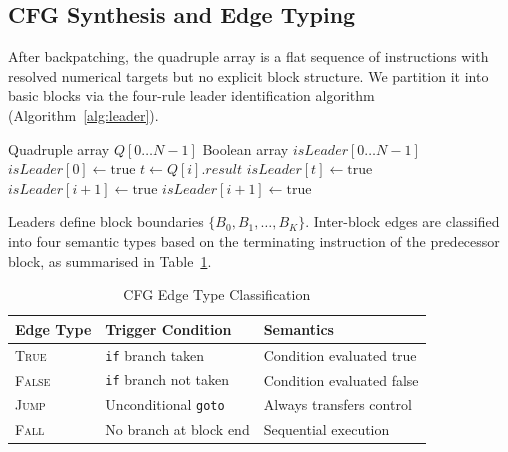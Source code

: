 \documentclass[conference]{IEEEtran}
\begin{document}
\subsection{CFG Synthesis and Edge Typing}
\label{sec:cfg}

After backpatching, the quadruple array is a flat sequence of instructions with resolved numerical targets but no explicit block structure. We partition it into basic blocks via the four-rule leader identification algorithm (Algorithm~\ref{alg:leader}).

\begin{algorithm}[t]
\caption{Leader Identification}
\label{alg:leader}
\footnotesize
\begin{algorithmic}[1]
\REQUIRE Quadruple array $Q[0 \dots N{-}1]$
\ENSURE Boolean array $\mathit{isLeader}[0 \dots N{-}1]$
\STATE $\mathit{isLeader}[0] \leftarrow \mathrm{true}$ 
        \STATE $t \leftarrow Q[i].\mathit{result}$
        \STATE $\mathit{isLeader}[t] \leftarrow \mathrm{true}$ 
            \STATE $\mathit{isLeader}[i{+}1] \leftarrow \mathrm{true}$ 
        \ENDIF
    \ENDIF
            \STATE $\mathit{isLeader}[i{+}1] \leftarrow \mathrm{true}$ 
        \ENDIF
    \ENDIF
\ENDFOR
\end{algorithmic}
\end{algorithm}

Leaders define block boundaries $\{B_0, B_1, \ldots, B_K\}$. Inter-block edges are classified into four semantic types based on the terminating instruction of the predecessor block, as summarised in Table~\ref{tab:edges}.

\begin{table}[t]
\centering
\caption{CFG Edge Type Classification}
\label{tab:edges}
\footnotesize
\begin{tabular}{@{}lll@{}}
\toprule
\textbf{Edge Type} & \textbf{Trigger Condition} & \textbf{Semantics}\\
\midrule
\textsc{True}  & \texttt{if} branch taken     & Condition evaluated true\\
\textsc{False} & \texttt{if} branch not taken & Condition evaluated false\\
\textsc{Jump}  & Unconditional \texttt{goto}  & Always transfers control\\
\textsc{Fall}  & No branch at block end       & Sequential execution\\
\bottomrule
\end{tabular}
\end{table}
\end{document}
